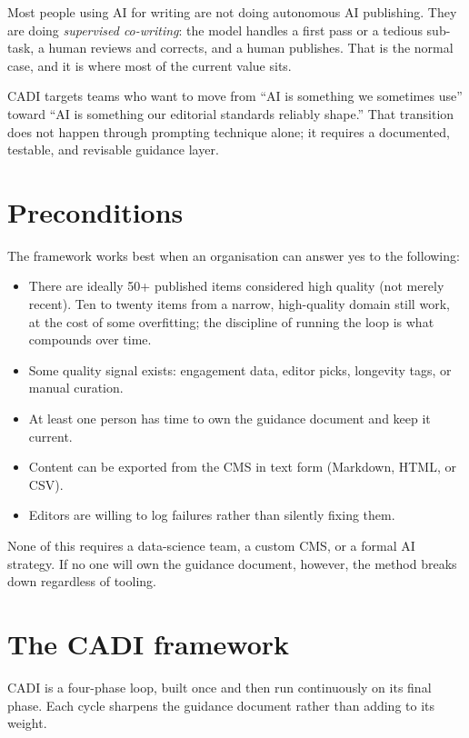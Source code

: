 \documentclass[11pt]{article}
\begin{document}
Most people using AI for writing are not doing autonomous AI
publishing. They are doing \emph{supervised co-writing}: the model
handles a first pass or a tedious sub-task, a human reviews and
corrects, and a human publishes. That is the normal case, and it is
where most of the current value sits.

CADI targets teams who want to move from ``AI is something we
sometimes use'' toward ``AI is something our editorial standards
reliably shape.'' That transition does not happen through prompting
technique alone; it requires a documented, testable, and revisable
guidance layer.

\section{Preconditions}

The framework works best when an organisation can answer yes to the
following:

\begin{itemize}[nosep]
  \item There are ideally 50+ published items considered high quality
        (not merely recent). Ten to twenty items from a narrow,
        high-quality domain still work, at the cost of some
        overfitting; the discipline of running the loop is what
        compounds over time.
  \item Some quality signal exists: engagement data, editor picks,
        longevity tags, or manual curation.
  \item At least one person has time to own the guidance document and
        keep it current.
  \item Content can be exported from the CMS in text form (Markdown,
        HTML, or CSV).
  \item Editors are willing to log failures rather than silently
        fixing them.
\end{itemize}

None of this requires a data-science team, a custom CMS, or a formal
AI strategy. If no one will own the guidance document, however, the
method breaks down regardless of tooling.

\section{The CADI framework}

CADI is a four-phase loop, built once and then run continuously on its
final phase. Each cycle sharpens the guidance document rather than
adding to its weight.
\end{document}

